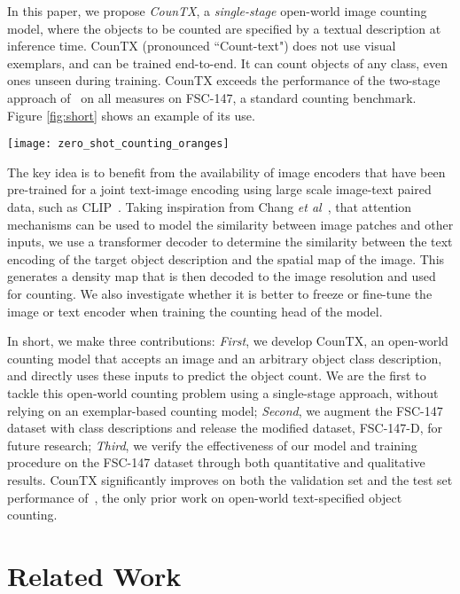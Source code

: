 \documentclass{bmvc2k}
\def\etal{\emph{et al}\bmvaOneDot}
\begin{document}
In this paper, we propose {\em CounTX}, a {\em single-stage} open-world image counting model, where the objects to be counted are specified by a textual description at inference time. CounTX (pronounced ``Count-text") does not use visual exemplars, and can be trained end-to-end. It can count objects of any class, even ones unseen during training. CounTX exceeds the performance of the two-stage approach of~\cite{Xu2023ZeroshotOC} on all measures on FSC-147, a standard counting benchmark. Figure \ref{fig:short} shows an example of its use.

\begin{figure*}
\centering
\texttt{[image: zero\_shot\_counting\_oranges]}
\vspace{-3mm}
   \caption{
CounTX estimates object counts directly from an image and a response to the question ``what object should be counted?''. In this example, two text inputs are used to predict the object counts of different objects in the same image. Note, no visual exemplars are required at any stage. 
}
\label{fig:short}
\end{figure*}
The key idea is to benefit from the availability of image encoders that have been pre-trained for a joint text-image encoding using large scale image-text paired data, such as CLIP~\cite{Radford2021LearningTV}. Taking inspiration from Chang \etal~\cite{Liu2022CounTRTG}, that attention mechanisms can be used to model the similarity between image patches and other inputs, we use a transformer decoder to determine the similarity between the text encoding of the target object description and the spatial map of the image. This generates a density map that is then decoded to the image resolution and used for counting. We also investigate whether it is better to freeze or fine-tune the image or text encoder when training the counting head of the model. 



In short, we make three contributions: \emph{First}, we develop CounTX, an open-world counting model that accepts an image and an arbitrary object class description, and directly uses these inputs to predict the object count. We are the first to tackle this open-world counting problem using a single-stage approach, without relying on an exemplar-based counting model; \emph{Second}, we augment the FSC-147~\cite{m_Ranjan-etal-CVPR21} dataset with class descriptions and release the modified dataset, FSC-147-D, for future research; \emph{Third}, we verify the effectiveness of our model and training procedure on the FSC-147 dataset through both quantitative and qualitative results. CounTX significantly improves on both the validation set and the test set performance 
 of~\cite{Xu2023ZeroshotOC}, the only prior work on open-world text-specified object counting. \section{Related Work}
\end{document}
